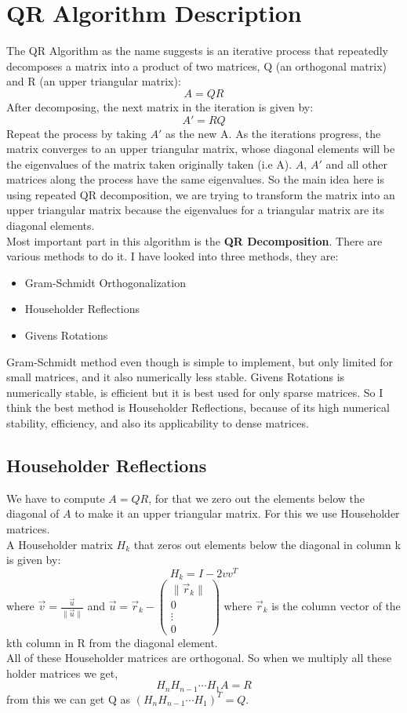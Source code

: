 \documentclass[a4paper, 14pt]{article}
\begin{document}
\section*{QR Algorithm Description}
The QR Algorithm as the name suggests is an iterative process that repeatedly decomposes a matrix into a product of two matrices, Q (an orthogonal  matrix) and R (an upper triangular matrix):
$$A = QR$$
After decomposing, the next matrix in the iteration is given by:
$$A' = RQ$$
Repeat the process by taking $A'$
as the new A. As the iterations progress, the matrix converges to an upper triangular matrix, whose diagonal elements will be the eigenvalues of the matrix taken originally taken (i.e A). $A$, $A'$ and all other matrices along the process have the same eigenvalues. So the main idea here is using repeated QR decomposition, we are trying to transform the matrix into an upper triangular matrix because the eigenvalues for a triangular matrix are its diagonal elements.\\
Most important part in this algorithm is the \textbf{QR Decomposition}. There are various methods to do it. I have looked into three methods, they are:
\begin{itemize}
    \item Gram-Schmidt Orthogonalization
    \item Householder Reflections
    \item Givens Rotations
\end{itemize}
Gram-Schmidt method even though is simple to implement, but only limited for small matrices, and it also numerically less stable. Givens Rotations is numerically stable, is efficient but it is best used for only sparse matrices. So I think the best method is Householder Reflections, because of its high numerical stability, efficiency, and also its applicability to dense matrices.
\subsection*{Householder Reflections}
We have to compute $A = QR$, for that we zero out the elements below the diagonal of $A$ to make it an upper triangular matrix. For this we use Householder matrices.\\
A Householder matrix $H_k$ that zeros out elements below the diagonal in column k is given by:
$$ H_k = I - 2vv^T $$
where $\vec{v} = \frac{\vec{u}}{\|\vec{u}\|}$ and $\vec{u} = \vec{r}_k - \begin{pmatrix}
\|\vec{r}_k\| \\ 
0 \\
\vdots\\
0
\end{pmatrix}$ where $\vec{r}_k$ is the column vector of the kth column in R from the diagonal element.\\
All of these Householder matrices are orthogonal. So when we multiply all these holder matrices we get,
$$H_n H_{n-1}\cdots H_1A = R$$ from this we can get Q as $(H_n H_{n-1}\cdots H_1)^T = Q$.
\end{document}
